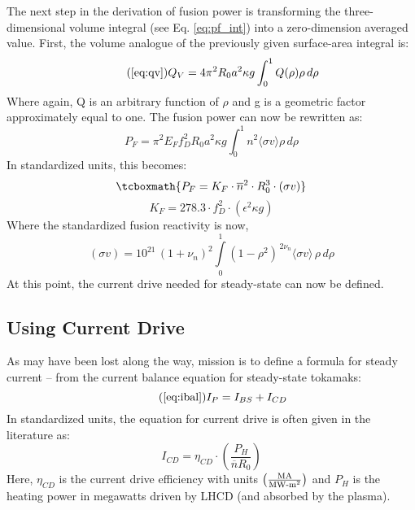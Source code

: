  The next step in the derivation of fusion power is transforming the three-dimensional volume integral (see Eq. \ref{eq:pf_int}) into a zero-dimension averaged value. First, the volume analogue of the previously given surface-area integral is:
 \begin{equation}
  	\tag{\ref{eq:qv}}
 	Q_V = 4 \pi^2 R_0 a^2 \kappa g \int_0^1 Q(\rho) \rho \, d\rho
 \end{equation}
 Where again, Q is an arbitrary function of $\rho$ and g is a geometric factor approximately equal to one. The fusion power can now be rewritten as:
 \begin{equation}
 	P_F = \pi^2 E_F f_D^2 R_0 a^2 \kappa g \int_0^1 n^2 \langle \sigma v \rangle \rho \, d\rho
 \end{equation}
In standardized units, this becomes:
\begin{equation}
	\label{eq:pf}
	\tcboxmath{
	P_F = K_F \cdot \overline{n}^2 \cdot R_0^3  \cdot (\sigma v)
	}
\end{equation}
\begin{equation}
  K_F = 278.3 \cdot f_D^2 \cdot ( \epsilon^2 \kappa g )
\end{equation}
Where the standardized fusion reactivity is now,
\begin{equation}
   (\sigma v) = 10^{21} \, (1+\nu_n)^2 \int\limits_0^1 ( 1 - \rho^2 ) ^ { \, 2 \nu_n} \langle \sigma v \rangle \, \rho \, d\rho
\end{equation}
At this point, the current drive needed for steady-state can now be defined.

\subsection{Using Current Drive}

As may have been lost along the way,  mission is to define a formula for steady current -- from the current balance equation for steady-state tokamaks:
\begin{equation}
		\tag{\ref{eq:ibal}}
		I_P = I_{BS} + I_{CD}
\end{equation}
In standardized units, the equation for current drive is often given in the literature as: \cite{itercd}
\begin{equation}
	I_{CD} = \eta_{CD} \cdot \left( \frac{P_H}{\overline n R_0} \right)
\end{equation}
Here, $\eta_{CD}$ is the current drive efficiency with units $ \left(
\frac{ \textnormal{MA} }{ \textnormal{MW-m}^2 } \right) $ and $P_H$ is the heating power in megawatts driven by LHCD (and absorbed by the plasma).

